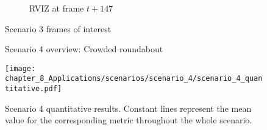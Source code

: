 \begin{figure}[]
\begin{subfigure}{0.42\textwidth}
		\label{subfig:chapter_8_Applications/scenarios/scenario_3/scenario_3_VRU_carla_t+5}
	\end{subfigure}
	\hfill
	\begin{subfigure}{0.42\textwidth}
		\caption{\ac{RVIZ} at frame $t+147$}
		\label{subfig:chapter_8_Applications/scenarios/scenario_3/scenario_3_VRU_rviz_t+5}
	\end{subfigure}
	\caption{Scenario 3 frames of interest}
	\label{fig:chapter_8_Applications/scenarios/scenario_3_frames_of_interest}
\end{figure}


\begin{figure}[]
	\centering
	\caption{Scenario 4 overview: Crowded roundabout}
	\label{fig:chapter_8_Applications/scenarios/scenario_4/scenario_4_route_27_town03_training}
\end{figure}

\begin{figure}[]
	\centering
	\texttt{[image: chapter\_8\_Applications/scenarios/scenario\_4/scenario\_4\_quantitative.pdf]}
	\captionsetup{justification=justified}
	\caption[Scenario 4 quantitative results]{Scenario 4 quantitative results. Constant lines represent the mean value for the corresponding metric throughout the whole scenario.}
	\label{fig:chapter_8_Applications/scenarios/scenario_4/scenario_4_quantitative}
\end{figure}

